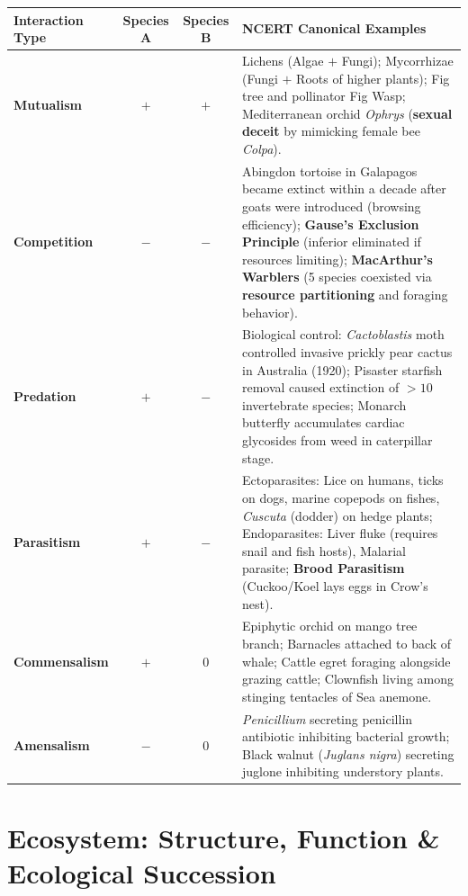 \documentclass[10pt,a4paper]{article}
\begin{document}
\begin{conceptbox}
\begin{center}
\small
\begin{tabular}{|l|c|c|p{8.8cm}|}
\hline
\textbf{Interaction Type} & \textbf{Species A} & \textbf{Species B} & \textbf{NCERT Canonical Examples} \\
\hline
\textbf{Mutualism} & $+$ & $+$ & Lichens (Algae $+$ Fungi); Mycorrhizae (Fungi $+$ Roots of higher plants); Fig tree and pollinator Fig Wasp; Mediterranean orchid \textit{Ophrys} (\textbf{sexual deceit} by mimicking female bee \textit{Colpa}). \\
\hline
\textbf{Competition} & $-$ & $-$ & Abingdon tortoise in Galapagos became extinct within a decade after goats were introduced (browsing efficiency); \textbf{Gause's Exclusion Principle} (inferior eliminated if resources limiting); \textbf{MacArthur's Warblers} (5 species coexisted via \textbf{resource partitioning} and foraging behavior). \\
\hline
\textbf{Predation} & $+$ & $-$ & Biological control: \textit{Cactoblastis} moth controlled invasive prickly pear cactus in Australia (1920); Pisaster starfish removal caused extinction of $>10$ invertebrate species; Monarch butterfly accumulates cardiac glycosides from weed in caterpillar stage. \\
\hline
\textbf{Parasitism} & $+$ & $-$ & Ectoparasites: Lice on humans, ticks on dogs, marine copepods on fishes, \textit{Cuscuta} (dodder) on hedge plants; Endoparasites: Liver fluke (requires snail and fish hosts), Malarial parasite; \textbf{Brood Parasitism} (Cuckoo/Koel lays eggs in Crow's nest). \\
\hline
\textbf{Commensalism} & $+$ & $0$ & Epiphytic orchid on mango tree branch; Barnacles attached to back of whale; Cattle egret foraging alongside grazing cattle; Clownfish living among stinging tentacles of Sea anemone. \\
\hline
\textbf{Amensalism} & $-$ & $0$ & \textit{Penicillium} secreting penicillin antibiotic inhibiting bacterial growth; Black walnut (\textit{Juglans nigra}) secreting juglone inhibiting understory plants. \\
\hline
\end{tabular}
\end{center}
\end{conceptbox}

\section{Ecosystem: Structure, Function \& Ecological Succession}
\end{document}
